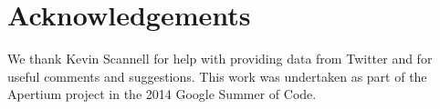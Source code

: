 \documentclass[11pt]{article}
\begin{document}


\section*{Acknowledgements}

We thank Kevin Scannell for help with providing data from Twitter and for useful comments and suggestions. This work
was undertaken as part of the Apertium project in the 2014 Google Summer of Code.



\end{document}
